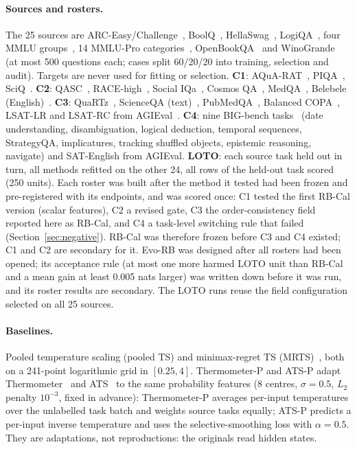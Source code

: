 \documentclass[runningheads]{llncs}
\begin{document}
\paragraph{Sources and rosters.}
The 25 sources are ARC-Easy/Challenge~\cite{clark2018arc}, BoolQ~\cite{clark2019boolq}, HellaSwag~\cite{zellers2019hellaswag}, LogiQA~\cite{liu2020logiqa}, four MMLU groups~\cite{hendrycks2021mmlu}, 14 MMLU-Pro categories~\cite{wang2024mmlupro}, OpenBookQA~\cite{mihaylov2018obqa} and WinoGrande~\cite{sakaguchi2020winogrande} (at most 500 questions each; cases split 60/20/20 into training, selection and audit).
Targets are never used for fitting or selection.
\textbf{C1}: AQuA-RAT~\cite{ling2017aqua}, PIQA~\cite{bisk2020piqa}, SciQ~\cite{welbl2017sciq}.
\textbf{C2}: QASC~\cite{khot2020qasc}, RACE-high~\cite{lai2017race}, Social IQa~\cite{sap2019socialiqa}, Cosmos QA~\cite{huang2019cosmos}, MedQA~\cite{jin2021medqa}, Belebele (English)~\cite{bandarkar2024belebele}.
\textbf{C3}: QuaRTz~\cite{tafjord2019quartz}, ScienceQA (text)~\cite{lu2022scienceqa}, PubMedQA~\cite{jin2019pubmedqa}, Balanced COPA~\cite{kavumba2019copa}, LSAT-LR and LSAT-RC from AGIEval~\cite{zhong2024agieval}.
\textbf{C4}: nine BIG-bench tasks~\cite{srivastava2023bigbench} (date understanding, disambiguation, logical deduction, temporal sequences, StrategyQA, implicatures, tracking shuffled objects, epistemic reasoning, navigate) and SAT-English from AGIEval.
\textbf{LOTO}: each source task held out in turn, all methods refitted on the other 24, all rows of the held-out task scored (250 units).
Each roster was built after the method it tested had been frozen and pre-registered with its endpoints, and was scored once: C1 tested the first RB-Cal version (scalar features), C2 a revised gate, C3 the order-consistency field reported here as RB-Cal, and C4 a task-level switching rule that failed (Section~\ref{sec:negative}).
RB-Cal was therefore frozen before C3 and C4 existed; C1 and C2 are secondary for it.
Evo-RB was designed after all rosters had been opened; its acceptance rule (at most one more harmed LOTO unit than RB-Cal and a mean gain at least 0.005 nats larger) was written down before it was run, and its roster results are secondary.
The LOTO runs reuse the field configuration selected on all 25 sources.

\paragraph{Baselines.}
Pooled temperature scaling (pooled TS) and minimax-regret TS (MRTS)~\cite{calport2026}, both on a 241-point logarithmic grid in $[0.25,4]$.
Thermometer-P and ATS-P adapt Thermometer~\cite{shen2024thermometer} and ATS~\cite{xie2024ats} to the same probability features (8 centres, $\sigma=0.5$, $L_2$ penalty $10^{-3}$, fixed in advance): Thermometer-P averages per-input temperatures over the unlabelled task batch and weights source tasks equally; ATS-P predicts a per-input inverse temperature and uses the selective-smoothing loss with $\alpha=0.5$.
They are adaptations, not reproductions: the originals read hidden states.
\end{document}
